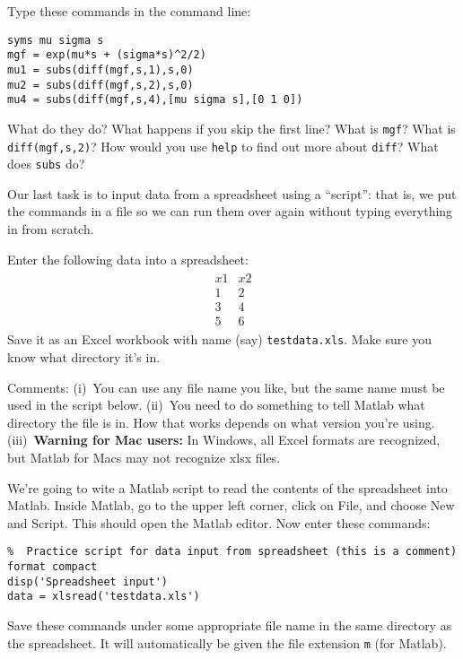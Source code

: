 \documentclass[11pt]{exam}
\begin{document}
\begin{questions}
Type these commands in the command line:
%
\begin{verbatim}
syms mu sigma s
mgf = exp(mu*s + (sigma*s)^2/2)
mu1 = subs(diff(mgf,s,1),s,0)
mu2 = subs(diff(mgf,s,2),s,0)
mu4 = subs(diff(mgf,s,4),[mu sigma s],[0 1 0])
\end{verbatim}
%
What do they do?
What happens if you skip the first line?
What is {\tt mgf}?
What is {\tt diff(mgf,s,2)}?
How would you use {\tt help} to find out more about {\tt diff}?
What does {\tt subs} do?


Our last task is to input data from a spreadsheet
using a ``script'':
that is, we put the commands in a file so we can run them over again without typing
everything in from scratch.
\begin{parts}
\item  Enter the following data into a spreadsheet:
\begin{eqnarray*}
    \begin{array}{cc}
        x1 & x2  \\ 1 & 2 \\ 3 & 4 \\ 5 & 6
    \end{array}
\end{eqnarray*}
Save it as an Excel workbook with name (say) {\tt testdata.xls}.
Make sure you know what directory it's in.

Comments:  (i)~You can use any file name you like,
but the same name must be used in the script below.
(ii)~You need to do something to tell Matlab what directory the file is in.
How that works depends on what version you're using.
(iii)~{\bf Warning for Mac users:}
In Windows, all Excel formats are recognized,
but Matlab for Macs may not recognize xlsx files.

\item  We're going to wite a Matlab script to read the contents of the spreadsheet into Matlab.
Inside Matlab, go to the upper left corner,
click on File, and choose New and Script.
This should open the Matlab editor.
Now enter these commands: \\
\begin{verbatim}
%  Practice script for data input from spreadsheet (this is a comment)
format compact
disp('Spreadsheet input')
data = xlsread('testdata.xls')
\end{verbatim}

\bigskip
Save these commands under some appropriate file name
in the same directory as the spreadsheet.
It will automatically be given the file extension {\tt m} (for Matlab).


\end{parts}
\end{questions}
\end{document}
